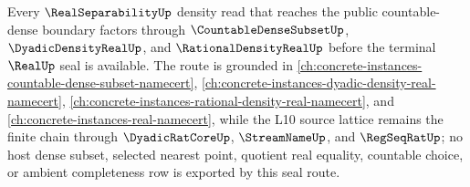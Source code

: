 Every $\RealSeparabilityUp$ density read that reaches the public countable-dense boundary factors through $\CountableDenseSubsetUp$, $\DyadicDensityRealUp$, and $\RationalDensityRealUp$ before the terminal $\RealUp$ seal is available. The route is grounded in \autoref{ch:concrete-instances-countable-dense-subset-namecert}, \autoref{ch:concrete-instances-dyadic-density-real-namecert}, \autoref{ch:concrete-instances-rational-density-real-namecert}, and \autoref{ch:concrete-instances-real-namecert}, while the L10 source lattice remains the finite chain through $\DyadicRatCoreUp$, $\StreamNameUp$, and $\RegSeqRatUp$; no host dense subset, selected nearest point, quotient real equality, countable choice, or ambient completeness row is exported by this seal route.
